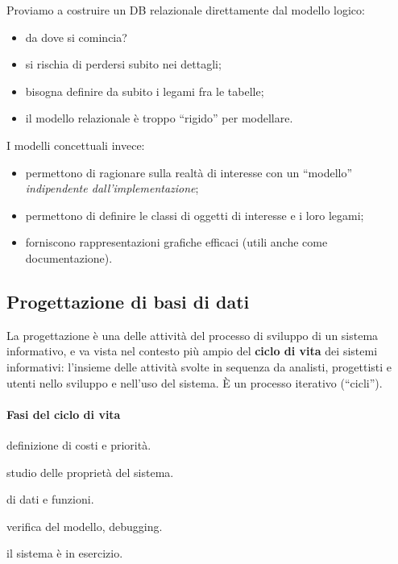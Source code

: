 \documentclass[a4paper,12pt]{article}
\begin{document}
Proviamo a costruire un DB relazionale direttamente dal modello logico:
\begin{itemize}
  \item da dove si comincia?
  \item si rischia di perdersi subito nei dettagli;
  \item bisogna definire da subito i legami fra le tabelle;
  \item il modello relazionale è troppo ``rigido'' per modellare.
\end{itemize}
I modelli concettuali invece:
\begin{itemize}
  \item permettono di ragionare sulla realtà di interesse con un ``modello''
    \emph{indipendente dall'implementazione};
  \item permettono di definire le classi di oggetti di interesse e i loro
    legami;
  \item forniscono rappresentazioni grafiche efficaci (utili anche come
    documentazione).
\end{itemize}

\subsection{Progettazione di basi di dati}

La progettazione è una delle attività del processo di sviluppo di un sistema
informativo, e va vista nel contesto più ampio del \textbf{ciclo di vita} dei
sistemi informativi: l'insieme delle attività svolte in sequenza da analisti,
progettisti e utenti nello sviluppo e nell'uso del sistema. È un processo
iterativo (``cicli'').

\paragraph{Fasi del ciclo di vita}
\begin{description}[style=nextline]
  \item[Studio di fattibilità] definizione di costi e priorità.
  \item[Raccolta e analisi dei requisiti] studio delle proprietà del sistema.
  \item[Progettazione] di dati e funzioni.
  \item[Realizzazione (implementazione)]
  \item[Validazione e collaudo] verifica del modello, debugging.
  \item[Funzionamento] il sistema è in esercizio.
\end{description}
\end{document}
